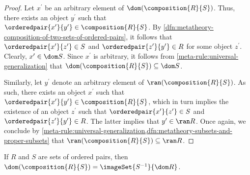 \begin{proof}
    Let \( x^{\prime} \) be an arbitrary element of \( \dom \mleft( \composition{R}{S} \mright) \).
    Thus, there exists an object \( y^{\prime} \) such that \( \orderedpair{x^{\prime}}{y^{\prime}} \in \composition{R}{S} \).
    By \cref{dfn:metatheory-composition-of-two-sets-of-ordered-pairs}, it follows that
    \( \orderedpair{x^{\prime}}{z^{\prime}} \in S \) and \( \orderedpair{z^{\prime}}{y^{\prime}} \in R \) for some object \( z^{\prime} \).
    Clearly, \( x^{\prime} \in \dom S \).
    Since \( x^{\prime} \) is arbitrary, it follows from \cref{meta-rule:universal-generalization} that \( \dom \mleft( \composition{R}{S} \mright) \subseteq \dom S \).

    \vspace{0.3cm}
    \noindent
    Similarly, let \( y^{\prime} \) denote an arbitrary element of \( \ran \mleft( \composition{R}{S} \mright) \).
    As such, there exists an object \( x^{\prime} \) such that \( \orderedpair{x^{\prime}}{y^{\prime}} \in \composition{R}{S} \), which
    in turn implies the existence of an object \( z^{\prime} \) such that \( \orderedpair{x^{\prime}}{z^{\prime}} \in S \) and \( \orderedpair{z^{\prime}}{y^{\prime}} \in R \).
    The latter implies that \( y^{\prime} \in \ran R \).
    Once again, we conclude by \cref{meta-rule:universal-generalization,dfn:metatheory-subsets-and-proper-subsets} that
    \( \ran \mleft( \composition{R}{S} \mright) \subseteq \ran R \).
\end{proof}

\begin{thm}
     \label{thm:metatheory-domain-of-composition-of-sets-of-ordered-pairs}
    If \( R \) and \( S \) are sets of ordered pairs, then \( \dom \mleft( \composition{R}{S} \mright) = \imageSet{S^{-1}}{\dom R} \).
\end{thm}

